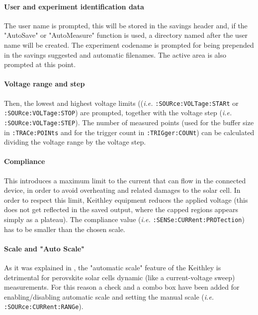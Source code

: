 		
		\paragraph{User and experiment identification data}
		The user name is prompted, this will be stored in the savings header and, if the "AutoSave" or "AutoMeasure" function is used, a directory named after the user name will be created.
		The experiment codename is prompted for being prepended in the savings suggested and automatic filenames.
		The active area is also prompted at this point.

		\paragraph{Voltage range and step}
		Then, the lowest and highest voltage limits ((\textsl{i.e.} \texttt{:SOURce:VOLTage:STARt} or \texttt{:SOURce:VOLTage:STOP}) are prompted, together with the voltage step (\textsl{i.e.} \texttt{:SOURce:VOLTage:STEP}).
		The number of measured points (used for the buffer size in \texttt{:TRACe:POINts} and for the trigger count in \texttt{:TRIGger:COUNt}) can be calculated dividing the voltage range by the voltage step.
		
		\paragraph{Compliance}
		This introduces a maximum limit to the current that can flow in the connected device, in order to avoid overheating and related damages to the solar cell.
		In order to respect this limit, Keithley equipment reduces the applied voltage (this does not get reflected in the saved output, where the capped regions appears simply as a plateau).
		The compliance value (\textsl{i.e.} \texttt{:SENSe:CURRent:PROTection}) has to be smaller than the chosen scale.
		
		\paragraph{Scale and "Auto Scale"}
		As it was explained in , the "automatic scale" feature of the Keithley is detrimental for perovskite solar cells dynamic (like a current\hyp{}voltage sweep) measurements.
		For this reason a check and a combo box have been added for enabling\-/disabling automatic scale and setting the manual scale (\textsl{i.e.} \texttt{:SOURce:CURRent:RANGe}).
		
